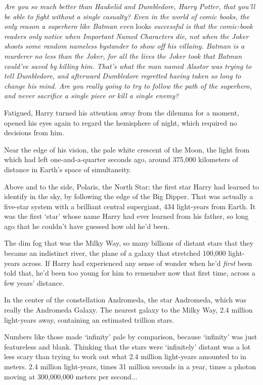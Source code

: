 \emph{Are you so much better than Haukelid and Dumbledore, Harry Potter, that you'll be able to fight without a single casualty? Even in the world of comic books, the only reason a superhero like Batman even} looks \emph{successful is that the comic-book readers only notice when Important Named Characters die, not when the Joker shoots some random nameless bystander to show off his villainy. Batman is a murderer no less than the Joker, for all the lives the Joker took that Batman could've saved by killing him. That's what the man named Alastor was trying to tell Dumbledore, and afterward Dumbledore regretted having taken so long to change his mind. Are you really going to try to follow the path of the superhero, and never sacrifice a single piece or kill a single enemy?}

Fatigued, Harry turned his attention away from the dilemma for a moment, opened his eyes again to regard the hemisphere of night, which required no decisions from him.

Near the edge of his vision, the pale white crescent of the Moon, the light from which had left one-and-a-quarter seconds ago, around 375,000 kilometers of distance in Earth's space of simultaneity.

Above and to the side, Polaris, the North Star; the first star Harry had learned to identify in the sky, by following the edge of the Big Dipper. That was actually a five-star system with a brilliant central supergiant, 434 light-years from Earth. It was the first `star' whose name Harry had ever learned from his father, so long ago that he couldn't have guessed how old he'd been.

The dim fog that was the Milky Way, so many billions of distant stars that they became an indistinct river, the plane of a galaxy that stretched 100,000 light-years across. If Harry had experienced any sense of wonder when he'd \emph{first} been told that, he'd been too young for him to remember now that first time, across a few years' distance.

In the center of the constellation Andromeda, the star Andromeda, which was really the Andromeda Galaxy. The nearest galaxy to the Milky Way, 2.4 million light-years away, containing an estimated trillion stars.

Numbers like those made `infinity' pale by comparison, because `infinity' was just featureless and blank. Thinking that the stars were `infinitely' distant was a lot less scary than trying to work out what 2.4 million light-years amounted to in meters. 2.4 million light-years, times 31 million seconds in a year, times a photon moving at 300,000,000 meters per second...


